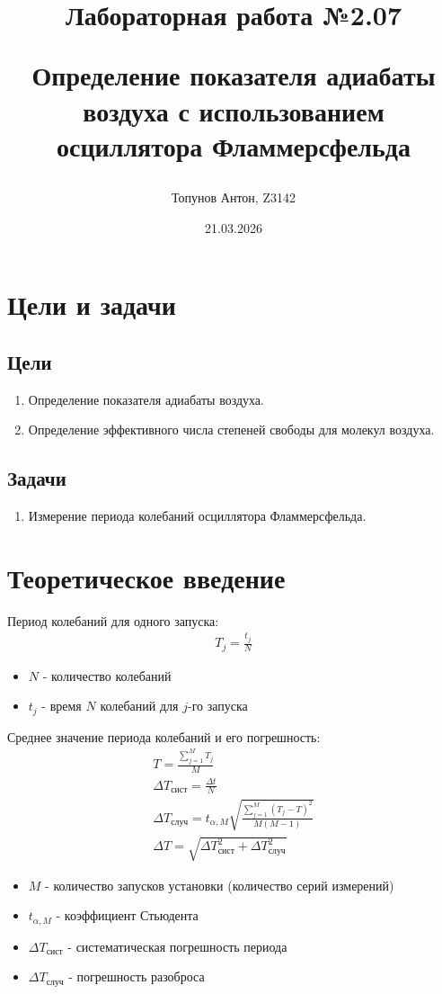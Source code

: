 \documentclass{article}
\title{Лабораторная работа №2.07

Определение показателя адиабаты воздуха с использованием осциллятора Фламмерсфельда}
\author{Топунов Антон, Z3142}
\date{21.03.2026}
\begin{document}
\maketitle
\clearpage
\section{Цели и задачи}
\subsection{Цели}
\begin{enumerate}
    \item Определение показателя адиабаты воздуха.
    \item Определение эффективного числа степеней свободы для молекул воздуха.
\end{enumerate}
\subsection{Задачи}
\begin{enumerate}
    \item Измерение периода колебаний осциллятора Фламмерсфельда.
\end{enumerate}
\section{Теоретическое введение}
Период колебаний для одного запуска:
\begin{gather*}
    T_j = \frac{ t_j}{ N}
\end{gather*}
\begin{itemize}
    \item $N$ - количество колебаний
    \item $t_j$ - время $N$ колебаний для $j$-го запуска
\end{itemize}
Среднее значение периода колебаний и его погрешность:
\begin{gather*}
    T = \frac{ \sum\limits_{ j=1}^{ M}T_j}{ M} \\
    \Delta T_{ \text{сист}} = \frac{ \Delta{t}}{ N}\\
    \Delta T_{ \text{случ}} = t_{ \alpha, M}\sqrt{\frac{ \sum\limits_{ j=1}^{M }(T_j - T)^2}{ M(M-1)} }\\
    \Delta T = \sqrt{\Delta T_{ \text{сист}}^2 + \Delta T_{ \text{случ}}^2}
\end{gather*}
\begin{itemize}
    \item $M$ - количество запусков установки (количество серий измерений)
    \item $t_{ \alpha, M}$ - коэффициент Стьюдента
    \item $\Delta T_{ \text{сист}}$ - систематическая погрешность периода
    \item $\Delta T_{ \text{случ}}$ - погрешность разоброса
\end{itemize}
\end{document}
